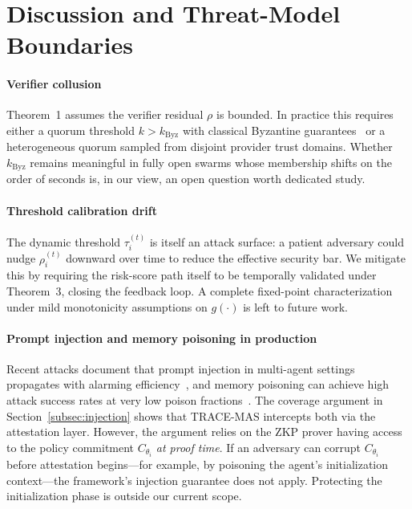 \documentclass[conference]{IEEEtran}
\begin{document}
\section{Discussion and Threat-Model Boundaries}
\label{sec:discussion}

\paragraph*{Verifier collusion}
Theorem~1 assumes the verifier residual $\rho$ is bounded. In
practice this requires either a quorum threshold
$k > k_{\mathrm{Byz}}$ with classical Byzantine
guarantees~\cite{ref:tc2024pbft} or a heterogeneous quorum sampled
from disjoint provider trust domains. Whether $k_{\mathrm{Byz}}$
remains meaningful in fully open swarms whose membership shifts on
the order of seconds is, in our view, an open question worth
dedicated study.

\paragraph*{Threshold calibration drift}
The dynamic threshold $\tau_i^{(t)}$ is itself an attack surface:
a patient adversary could nudge $\rho_i^{(t)}$ downward over time
to reduce the effective security bar. We mitigate this by requiring
the risk-score path itself to be temporally validated under
Theorem~3, closing the feedback loop. A complete fixed-point
characterization under mild monotonicity assumptions on $g(\cdot)$
is left to future work.

\paragraph*{Prompt injection and memory poisoning in production}
Recent attacks document that prompt injection in multi-agent
settings propagates with alarming efficiency~\cite{ref:promptinfection2024},
and memory poisoning can achieve high attack success rates at very
low poison fractions~\cite{ref:agentpoison2024}. The coverage
argument in Section~\ref{subsec:injection} shows that
\textsc{TRACE-MAS} intercepts both via the attestation layer.
However, the argument relies on the ZKP prover having access to the
policy commitment $C_{\theta_i}$ \emph{at proof time}. If an
adversary can corrupt $C_{\theta_i}$ before attestation begins---for
example, by poisoning the agent's initialization context---the
framework's injection guarantee does not apply. Protecting the
initialization phase is outside our current scope.
\end{document}
